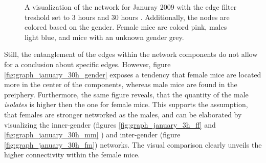 \begin{figure}[htpb]%
	\centering 
	\qquad 
			
	\caption[Network visualizations with different edge filter values]{A visualization of the network for Januray 2009 with the edge filter treshold set to 3 hours  and 30 hours . Additionally, the nodes are colored based on the gender. Female mice are colord pink, males light blue, and mice with an unknown gender grey.} 
	 
\end{figure}

Still, the entanglement of the edges within the network components do not allow for a conclusion about specific edges. However, figure \ref{fig:graph_january_30h_gender} exposes a tendency that female mice are located more in the center of the components, whereas male mice are found in the preiphery. Furthermore, the same figure reveals, that the quantity of the male \textit{isolates} is higher then the one for female mice. This supports the assumption, that females are stronger networked as the males, and can be elaborated by visualizing the inner-gender (figures \ref{fig:graph_january_3h_ff} and \ref{fig:graph_january_30h_mm} ) and inter-gender (figure \ref{fig:graph_january_30h_fm}) networks. The visual comparison clearly unveils the higher connectivity within the female mice.

